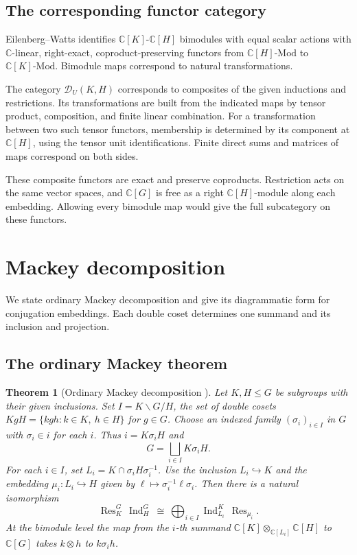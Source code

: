 \documentclass[11pt,a4paper]{article}
\numberwithin{equation}{section}
\newtheorem{theorem}{Theorem}[section]
\theoremstyle{definition}
\newcommand{\C}{\mathbb C}
\newcommand{\Mod}{\text{-}\mathrm{Mod}}
\newcommand{\Ind}{\operatorname{Ind}}
\newcommand{\Res}{\operatorname{Res}}
\begin{document}
\subsection{The corresponding functor category}\label{sec:functors}

Eilenberg--Watts identifies \(\C[K]\)-\(\C[H]\) bimodules with equal
scalar actions with \(\C\)-linear, right-exact, coproduct-preserving
functors from \(\C[H]\Mod\) to \(\C[K]\Mod\). Bimodule maps
correspond to natural transformations.

The category \(\mathcal D_U(K,H)\) corresponds to composites of the
given inductions and restrictions. Its transformations are built
from the indicated maps by tensor product, composition, and finite
linear combination. For a transformation between two such tensor
functors, membership is determined by its component at \(\C[H]\),
using the tensor unit identifications. Finite direct sums and
matrices of maps correspond on both sides.

These composite functors are exact and preserve coproducts.
Restriction acts on the same vector spaces, and \(\C[G]\) is free as
a right \(\C[H]\)-module along each embedding. Allowing every bimodule
map would give the full subcategory on these functors.

\section{Mackey decomposition}\label{sec:mackey}

We state ordinary Mackey decomposition and give its diagrammatic
form for conjugation embeddings. Each double coset determines one
summand and its inclusion and projection.
\subsection{The ordinary Mackey theorem}

\begin{theorem}[Ordinary Mackey decomposition \cite{mackey}]\label{thm:ordinary-mackey}
Let \(K,H\le G\) be subgroups with their given inclusions. Set
\(I=K\backslash G/H\), the set of double cosets
\(KgH=\{kgh:k\in K,\ h\in H\}\) for \(g\in G\).
Choose an indexed family \((\sigma_i)_{i\in I}\) in \(G\) with
\(\sigma_i\in i\) for each \(i\). Thus \(i=K\sigma_i H\) and
\[
 G=\bigsqcup_{i\in I}K\sigma_i H .
\]
For each \(i\in I\), set \(L_i=K\cap\sigma_i H\sigma_i^{-1}\).
Use the inclusion \(L_i\hookrightarrow K\) and the embedding
\(\mu_i:L_i\hookrightarrow H\) given by \(\ell\mapsto\sigma_i^{-1}\ell\sigma_i\).
Then there is a natural isomorphism
\[
 \Res_K^G\,\Ind_H^G
    \ \cong\ \bigoplus_{i\in I}\Ind_{L_i}^K\,\Res_{\mu_i}.
\]
At the bimodule level the map from the \(i\)-th summand
\(\C[K]\otimes_{\C[L_i]}\C[H]\) to \(\C[G]\) takes
\(k\otimes h\) to \(k\sigma_i h\).
\end{theorem}
\end{document}
